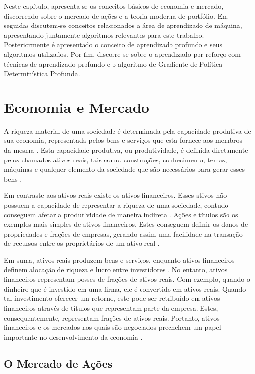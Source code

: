 Neste capítulo, apresenta-se os conceitos básicos de economia e mercado, discorrendo sobre o mercado de ações e a teoria moderna de portfólio. Em seguidas discutem-se conceitos relacionados a área de aprendizado de máquina, apresentando juntamente algoritmos relevantes para este trabalho. Posteriormente é apresentado o conceito de aprendizado profundo e seus algoritmos utilizados. Por fim, discorre-se sobre o aprendizado por reforço com técnicas de aprendizado profundo e o algoritmo de Gradiente de Política Determinística Profunda.


\section{Economia e Mercado}

A riqueza material de uma sociedade é determinada pela capacidade produtiva de sua economia, representada pelos bens e serviços que esta fornece aos membros da mesma \cite{investments}. Esta capacidade produtiva, ou produtividade, é definida diretamente pelos chamados ativos reais, tais como: construções, conhecimento, terras, máquinas e qualquer elemento da sociedade que são necessários para gerar esses bens \cite{investments}.

Em contraste aos ativos reais existe os ativos financeiros. Esses ativos não possuem a capacidade de representar a riqueza de uma sociedade, contudo conseguem afetar a produtividade de maneira indireta \cite{investments}. Ações e títulos são os exemplos mais simples de ativos financeiros. Estes conseguem definir os donos de propriedades e frações de empresas, gerando assim uma facilidade na transação de recursos entre os proprietários de um ativo real \cite{investments}.

Em suma, ativos reais produzem bens e serviços, enquanto ativos financeiros definem alocação de riqueza e lucro entre investidores \cite{investments}. No entanto, ativos financeiros representam posses de frações de ativos reais. Com exemplo, quando o dinheiro que é investido em uma firma, ele é convertido em ativos reais. Quando tal investimento oferecer um retorno, este pode ser retribuído em ativos financeiros através de títulos que representam parte da empresa. Estes, consequentemente, representam frações de ativos reais. Portanto, ativos financeiros e os mercados nos quais são negociados preenchem um papel importante no desenvolvimento da economia \cite{investments}.

\subsection{O Mercado de Ações}

